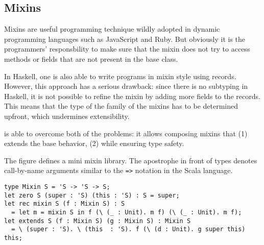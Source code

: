 


\subsection{Mixins}

Mixins are useful programming technique wildly adopted in dynamic programming
languages such as JavaScript and Ruby. But obviously it is the programmers'
responsbility to make sure that the mixin does not try to access methods or
fields that are not present in the base class.

In Haskell, one is also able to write programs in mixin style using records.
However, this approach has a serious drawback: since there is no subtyping in
Haskell, it is not possible to refine the mixin by adding more fields to the
records. This means that the type of the family of the mixins has to be
determined upfront, which undermines extensibility.

\name is able to overcome both of the problems: it allows composing mixins
that (1) extends the base behavior, (2) while ensuring type safety.

The figure defines a mini mixin library. The apostrophe in front of types
denotes call-by-name arguments similar to the \lstinline{=>} notation in the
Scala language.

\begin{lstlisting}
type Mixin S = 'S -> 'S -> S;
let zero S (super : 'S) (this : 'S) : S = super;
let rec mixin S (f : Mixin S) : S
  = let m = mixin S in f (\ (_ : Unit). m f) (\ (_ : Unit). m f);
let extends S (f : Mixin S) (g : Mixin S) : Mixin S
  = \ (super : 'S). \ (this  : 'S). f (\ (d : Unit). g super this) this;
\end{lstlisting}

